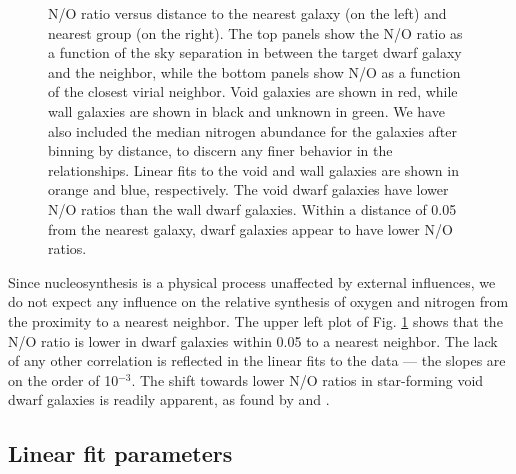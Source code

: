 \begin{figure}
    \caption[N/O versus distance to nearest neighbor and group]{N/O ratio versus 
    distance to the nearest galaxy (on the left) and nearest group (on the 
    right).  The top panels show the N/O ratio as a function of the sky 
    separation in \hMpc between the target dwarf galaxy and the neighbor, while 
    the bottom panels show N/O as a function of the closest virial neighbor.  
    Void galaxies are shown in red, while wall galaxies are shown in black and 
    unknown in green.  We have also included the median nitrogen abundance for 
    the galaxies after binning by distance, to discern any finer behavior in the 
    relationships.  Linear fits to the void and wall galaxies are shown in 
    orange and blue, respectively.  The void dwarf galaxies have lower N/O 
    ratios than the wall dwarf galaxies.  Within a distance of 0.05 \hMpc from 
    the nearest galaxy, dwarf galaxies appear to have lower N/O ratios.}
    \label{fig:NO}
\end{figure}

Since nucleosynthesis is a physical process unaffected by external influences, 
we do not expect any influence on the relative synthesis of oxygen and nitrogen 
from the proximity to a nearest neighbor.  The upper left plot of Fig. 
\ref{fig:NO} shows that the N/O ratio is lower in dwarf galaxies within 0.05 
\hMpc to a nearest neighbor.  The lack of any other correlation is reflected in 
the linear fits to the data --- the slopes are on the order of 10$^{-3}$.  The 
shift towards lower N/O ratios in star-forming void dwarf galaxies is readily 
apparent, as found by \cite{Douglass17b} and \cite{Douglass17c}.


\subsection{Linear fit parameters}

